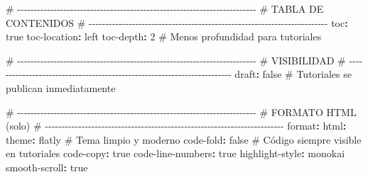 \documentclass[
  doc,
  floatsintext,
  longtable,
  a4paper,
  nolmodern,
  notxfonts,
  notimes,
  12pt,
  colorlinks=true,linkcolor=blue,citecolor=blue,urlcolor=blue]{apa7}
\newenvironment{Shaded}{\begin{snugshade}}{\end{snugshade}}
\newcommand{\AttributeTok}[1]{\textcolor[rgb]{0.40,0.45,0.13}{#1}}
\newcommand{\CharTok}[1]{\textcolor[rgb]{0.13,0.47,0.30}{#1}}
\newcommand{\CommentTok}[1]{\textcolor[rgb]{0.37,0.37,0.37}{#1}}
\newcommand{\DecValTok}[1]{\textcolor[rgb]{0.68,0.00,0.00}{#1}}
\newcommand{\FunctionTok}[1]{\textcolor[rgb]{0.28,0.35,0.67}{#1}}
\newcommand{\KeywordTok}[1]{\textcolor[rgb]{0.00,0.23,0.31}{\textbf{#1}}}
\begin{document}
\begin{Shaded}
\begin{Highlighting}[]
\CommentTok{\# {-}{-}{-}{-}{-}{-}{-}{-}{-}{-}{-}{-}{-}{-}{-}{-}{-}{-}{-}{-}{-}{-}{-}{-}{-}{-}{-}{-}{-}{-}{-}{-}{-}{-}{-}{-}{-}{-}{-}{-}{-}{-}{-}{-}{-}{-}{-}{-}{-}{-}{-}{-}{-}{-}{-}{-}{-}{-}{-}{-}{-}{-}{-}{-}{-}{-}{-}{-}{-}{-}{-}{-}}
\CommentTok{\# TABLA DE CONTENIDOS}
\CommentTok{\# {-}{-}{-}{-}{-}{-}{-}{-}{-}{-}{-}{-}{-}{-}{-}{-}{-}{-}{-}{-}{-}{-}{-}{-}{-}{-}{-}{-}{-}{-}{-}{-}{-}{-}{-}{-}{-}{-}{-}{-}{-}{-}{-}{-}{-}{-}{-}{-}{-}{-}{-}{-}{-}{-}{-}{-}{-}{-}{-}{-}{-}{-}{-}{-}{-}{-}{-}{-}{-}{-}{-}{-}}
\FunctionTok{toc}\KeywordTok{:}\AttributeTok{ }\CharTok{true}
\FunctionTok{toc{-}location}\KeywordTok{:}\AttributeTok{ left}
\FunctionTok{toc{-}depth}\KeywordTok{:}\AttributeTok{ }\DecValTok{2}\CommentTok{                \# Menos profundidad para tutoriales}

\CommentTok{\# {-}{-}{-}{-}{-}{-}{-}{-}{-}{-}{-}{-}{-}{-}{-}{-}{-}{-}{-}{-}{-}{-}{-}{-}{-}{-}{-}{-}{-}{-}{-}{-}{-}{-}{-}{-}{-}{-}{-}{-}{-}{-}{-}{-}{-}{-}{-}{-}{-}{-}{-}{-}{-}{-}{-}{-}{-}{-}{-}{-}{-}{-}{-}{-}{-}{-}{-}{-}{-}{-}{-}{-}}
\CommentTok{\# VISIBILIDAD}
\CommentTok{\# {-}{-}{-}{-}{-}{-}{-}{-}{-}{-}{-}{-}{-}{-}{-}{-}{-}{-}{-}{-}{-}{-}{-}{-}{-}{-}{-}{-}{-}{-}{-}{-}{-}{-}{-}{-}{-}{-}{-}{-}{-}{-}{-}{-}{-}{-}{-}{-}{-}{-}{-}{-}{-}{-}{-}{-}{-}{-}{-}{-}{-}{-}{-}{-}{-}{-}{-}{-}{-}{-}{-}{-}}
\FunctionTok{draft}\KeywordTok{:}\AttributeTok{ }\CharTok{false}\CommentTok{                \# Tutoriales se publican inmediatamente}

\CommentTok{\# {-}{-}{-}{-}{-}{-}{-}{-}{-}{-}{-}{-}{-}{-}{-}{-}{-}{-}{-}{-}{-}{-}{-}{-}{-}{-}{-}{-}{-}{-}{-}{-}{-}{-}{-}{-}{-}{-}{-}{-}{-}{-}{-}{-}{-}{-}{-}{-}{-}{-}{-}{-}{-}{-}{-}{-}{-}{-}{-}{-}{-}{-}{-}{-}{-}{-}{-}{-}{-}{-}{-}{-}}
\CommentTok{\# FORMATO HTML (solo)}
\CommentTok{\# {-}{-}{-}{-}{-}{-}{-}{-}{-}{-}{-}{-}{-}{-}{-}{-}{-}{-}{-}{-}{-}{-}{-}{-}{-}{-}{-}{-}{-}{-}{-}{-}{-}{-}{-}{-}{-}{-}{-}{-}{-}{-}{-}{-}{-}{-}{-}{-}{-}{-}{-}{-}{-}{-}{-}{-}{-}{-}{-}{-}{-}{-}{-}{-}{-}{-}{-}{-}{-}{-}{-}{-}}
\FunctionTok{format}\KeywordTok{:}
\AttributeTok{  }\FunctionTok{html}\KeywordTok{:}
\AttributeTok{    }\FunctionTok{theme}\KeywordTok{:}\AttributeTok{ flatly}\CommentTok{           \# Tema limpio y moderno}
\AttributeTok{    }\FunctionTok{code{-}fold}\KeywordTok{:}\AttributeTok{ }\CharTok{false}\CommentTok{        \# Código siempre visible en tutoriales}
\AttributeTok{    }\FunctionTok{code{-}copy}\KeywordTok{:}\AttributeTok{ }\CharTok{true}
\AttributeTok{    }\FunctionTok{code{-}line{-}numbers}\KeywordTok{:}\AttributeTok{ }\CharTok{true}
\AttributeTok{    }\FunctionTok{highlight{-}style}\KeywordTok{:}\AttributeTok{ monokai}
\AttributeTok{    }\FunctionTok{smooth{-}scroll}\KeywordTok{:}\AttributeTok{ }\CharTok{true}


\end{Highlighting}
\end{Shaded}
\end{document}
